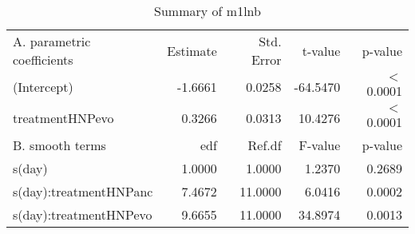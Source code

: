 \begin{table}[ht]
\centering
\begin{tabular}{lrrrr}
   \hline
A. parametric coefficients & Estimate & Std. Error & t-value & p-value \\ 
  (Intercept) & -1.6661 & 0.0258 & -64.5470 & $<$ 0.0001 \\ 
  treatmentHNPevo & 0.3266 & 0.0313 & 10.4276 & $<$ 0.0001 \\ 
   \hline
B. smooth terms & edf & Ref.df & F-value & p-value \\ 
  s(day) & 1.0000 & 1.0000 & 1.2370 & 0.2689 \\ 
  s(day):treatmentHNPanc & 7.4672 & 11.0000 & 6.0416 & 0.0002 \\ 
  s(day):treatmentHNPevo & 9.6655 & 11.0000 & 34.8974 & 0.0013 \\ 
   \hline
\end{tabular}
\caption{Summary of m1lnb} 
\label{tab.gam}
\end{table}

